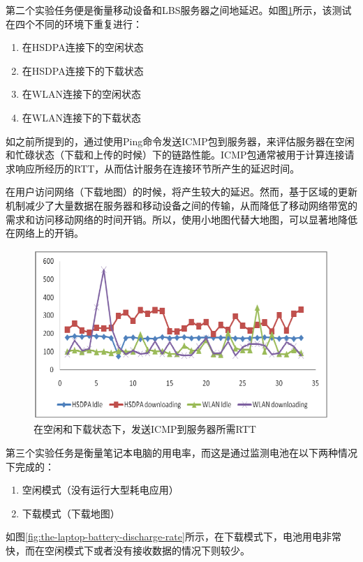 \documentclass{article}
\begin{document}
\begin{CJK}{UTF8}{gbsn}
	第二个实验任务便是衡量移动设备和LBS服务器之间地延迟。如图\ref{fig:the-rtt-taken-to-send-icmps}所示，该测试在四个不同的环境下重复进行：
	\begin{enumerate}
		\item 在HSDPA连接下的空闲状态
		\item 在HSDPA连接下的下载状态
		\item 在WLAN连接下的空闲状态
		\item 在WLAN连接下的下载状态
	\end{enumerate}
	
	如之前所提到的，通过使用Ping命令发送ICMP包到服务器，来评估服务器在空闲和忙碌状态（下载和上传的时候）下的链路性能。ICMP包通常被用于计算连接请求响应所经历的RTT，从而估计服务在连接环节所产生的延迟时间。

	在用户访问网络（下载地图）的时候，将产生较大的延迟。然而，基于区域的更新机制减少了大量数据在服务器和移动设备之间的传输，从而降低了移动网络带宽的需求和访问移动网络的时间开销。所以，使用小地图代替大地图，可以显著地降低在网络上的开销。

	\begin{figure}[htbp]
		\centering
		\includegraphics[bb=0 0 743 426, scale=0.45]{figure/fig08.png}
		\caption{在空闲和下载状态下，发送ICMP到服务器所需RTT}
		\label{fig:the-rtt-taken-to-send-icmps}
	\end{figure}

	第三个实验任务是衡量笔记本电脑的用电率，而这是通过监测电池在以下两种情况下完成的：
	\begin{enumerate}
		\item 空闲模式（没有运行大型耗电应用）
		\item 下载模式（下载地图）
	\end{enumerate}

	如图\ref{fig:the-laptop-battery-discharge-rate}所示，在下载模式下，电池用电非常快，而在空闲模式下或者没有接收数据的情况下则较少。


\end{CJK}
\end{document}
